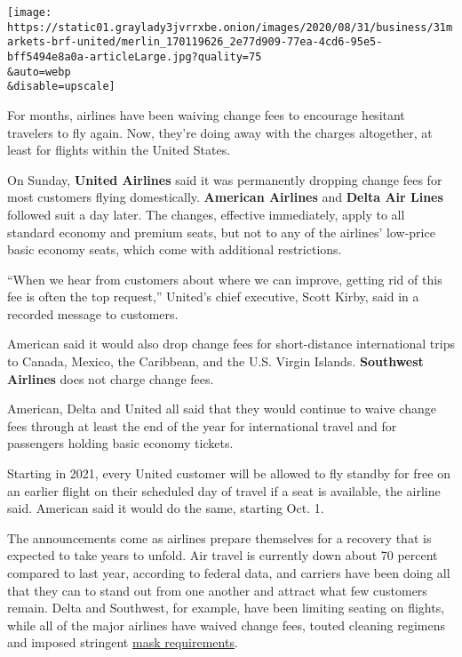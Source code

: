 \texttt{[image: https://static01.graylady3jvrrxbe.onion/images/2020/08/31/business/31markets-brf-united/merlin\_170119626\_2e77d909-77ea-4cd6-95e5-bff5494e8a0a-articleLarge.jpg?quality=75\\\&auto=webp\\\&disable=upscale]}

For months, airlines have been waiving change fees to encourage hesitant
travelers to fly again. Now, they're doing away with the charges
altogether, at least for flights within the United States.

On Sunday, \textbf{United Airlines} said it was permanently dropping
change fees for most customers flying domestically. \textbf{American
Airlines} and \textbf{Delta Air Lines} followed suit a day later. The
changes, effective immediately, apply to all standard economy and
premium seats, but not to any of the airlines' low-price basic economy
seats, which come with additional restrictions.

``When we hear from customers about where we can improve, getting rid of
this fee is often the top request,'' United's chief executive, Scott
Kirby, said in a recorded message to customers.

American said it would also drop change fees for short-distance
international trips to Canada, Mexico, the Caribbean, and the U.S.
Virgin Islands. \textbf{Southwest Airlines} does not charge change fees.

American, Delta and United all said that they would continue to waive
change fees through at least the end of the year for international
travel and for passengers holding basic economy tickets.

Starting in 2021, every United customer will be allowed to fly standby
for free on an earlier flight on their scheduled day of travel if a seat
is available, the airline said. American said it would do the same,
starting Oct. 1.

The announcements come as airlines prepare themselves for a recovery
that is expected to take years to unfold. Air travel is currently down
about 70 percent compared to last year, according to federal data, and
carriers have been doing all that they can to stand out from one another
and attract what few customers remain. Delta and Southwest, for example,
have been limiting seating on flights, while all of the major airlines
have waived change fees, touted cleaning regimens and imposed stringent
\href{https://www.nytimes3xbfgragh.onion/live/2020/08/27/business/stock-market-today-coronavirus/delta-has-barred-about-240-people-from-flying-for-not-wearing-masks}{mask
requirements}.

